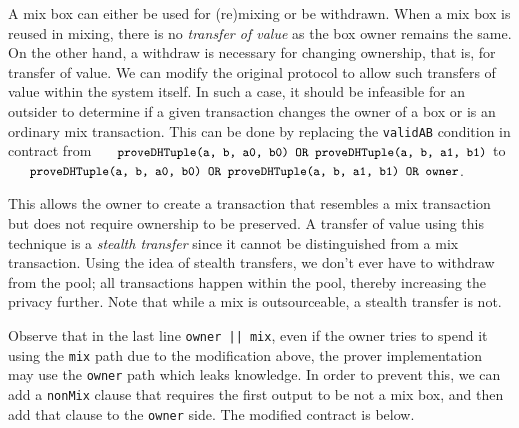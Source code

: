 \documentclass[runningheads]{llncs}
\begin{document}
A mix box can either be used for (re)mixing or be withdrawn. When a mix box is reused in mixing, there is no {\em transfer of value} as the box owner remains the same. On the other hand, a withdraw is necessary for changing ownership, that is, for transfer of value. We can modify the original protocol to allow such transfers of value within the system itself. In such a case, it should be infeasible for an outsider to determine if a given transaction changes the owner of a box or is an ordinary mix transaction. This can be done by replacing the \texttt{validAB} condition in contract from $\texttt{\small{proveDHTuple(a, b, a0, b0) OR proveDHTuple(a, b, a1, b1)}}$
to $\texttt{\small{proveDHTuple(a, b, a0, b0) OR proveDHTuple(a, b, a1, b1) OR owner}}$.

This allows the owner to create a transaction that resembles a mix transaction but does not require ownership to be preserved.
A transfer of value using this technique is a {\em stealth transfer} since it cannot be distinguished from a mix transaction.
Using the idea of stealth transfers, we don't ever have to withdraw from the pool; all transactions happen within the pool, thereby increasing the privacy further. Note that while a mix is outsourceable, a stealth transfer is not.

Observe that in the last line \texttt{owner || mix}, even if the owner tries to spend it using the \texttt{mix} path due to the modification above,
the prover implementation may use the \texttt{owner} path which leaks knowledge. In order to prevent this, we can add a \texttt{nonMix} clause that requires the first output to be not a mix box, and then add that clause to the \texttt{owner} side. The modified contract is below.
\end{document}
